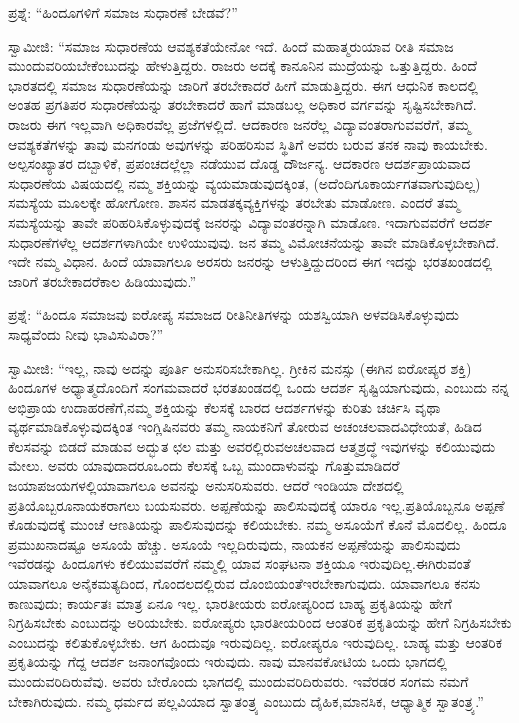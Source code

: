 \eject

ಪ್ರಶ್ನೆ: “ಹಿಂದೂಗಳಿಗೆ ಸಮಾಜ ಸುಧಾರಣೆ ಬೇಡವೆ?”

ಸ್ವಾಮೀಜಿ: “ಸಮಾಜ ಸುಧಾರಣೆಯ ಆವಶ್ಯಕತೆಯೇನೋ ಇದೆ. ಹಿಂದೆ ಮಹಾತ್ಮರು\break ಯಾವ ರೀತಿ ಸಮಾಜ ಮುಂದುವರಿಯಬೇಕೆಂಬುದನ್ನು ಹೇಳುತ್ತಿದ್ದರು. ರಾಜರು ಅದಕ್ಕೆ ಕಾನೂನಿನ ಮುದ್ರೆಯನ್ನು ಒತ್ತುತ್ತಿದ್ದರು. ಹಿಂದೆ ಭಾರತದಲ್ಲಿ ಸಮಾಜ ಸುಧಾರಣೆಯನ್ನು ಜಾರಿಗೆ ತರಬೇಕಾದರೆ ಹೀಗೆ ಮಾಡುತ್ತಿದ್ದರು. ಈಗ ಆಧುನಿಕ ಕಾಲದಲ್ಲಿ ಅಂತಹ ಪ್ರಗತಿಪರ ಸುಧಾರಣೆಯನ್ನು ತರಬೇಕಾದರೆ ಹಾಗೆ ಮಾಡಬಲ್ಲ ಅಧಿಕಾರ ವರ್ಗವನ್ನು ಸೃಷ್ಟಿಸಬೇಕಾಗಿದೆ. ರಾಜರು ಈಗ ಇಲ್ಲವಾಗಿ ಅಧಿಕಾರವೆಲ್ಲ ಪ್ರಜೆಗಳಲ್ಲಿದೆ. ಆದಕಾರಣ ಜನರೆಲ್ಲ ವಿದ್ಯಾವಂತರಾಗುವವರೆಗೆ, ತಮ್ಮ ಆವಶ್ಯಕತೆಗಳನ್ನು ತಾವು ಮನಗಂಡು ಅವುಗಳನ್ನು ಪರಿಹರಿಸುವ ಸ್ಥಿತಿಗೆ ಅವರು ಬರುವ ತನಕ ನಾವು ಕಾಯಬೇಕು. ಅಲ್ಪಸಂಖ್ಯಾತರ ದಬ್ಬಾಳಿಕೆ, ಪ್ರಪಂಚದಲ್ಲೆಲ್ಲಾ ನಡೆಯುವ ದೊಡ್ಡ ದೌರ್ಜನ್ಯ. ಆದಕಾರಣ ಆದರ್ಶಪ್ರಾಯವಾದ ಸುಧಾರಣೆಯ ವಿಷಯದಲ್ಲಿ ನಮ್ಮ ಶಕ್ತಿಯನ್ನು ವ್ಯಯಮಾಡುವುದಕ್ಕಿಂತ, (ಅದೆಂದಿಗೂ\break ಕಾರ್ಯಗತವಾಗುವುದಿಲ್ಲ) ಸಮಸ್ಯೆಯ ಮೂಲಕ್ಕೇ ಹೋಗೋಣ. ಶಾಸನ ಮಾಡತಕ್ಕ\break ವ್ಯಕ್ತಿಗಳನ್ನು ತರಬೇತು ಮಾಡೋಣ. ಎಂದರೆ ತಮ್ಮ ಸಮಸ್ಯೆಯನ್ನು ತಾವೇ ಪರಿಹರಿಸಿಕೊಳ್ಳುವುದಕ್ಕೆ ಜನರನ್ನು ವಿದ್ಯಾವಂತರನ್ನಾಗಿ ಮಾಡೊಣ. ಇದಾಗುವವರೆಗೆ ಆದರ್ಶ ಸುಧಾರಣೆಗಳೆಲ್ಲ ಆದರ್ಶಗಳಾಗಿಯೇ ಉಳಿಯುವುವು. ಜನ ತಮ್ಮ ವಿಮೋಚನೆಯನ್ನು ತಾವೇ ಮಾಡಿಕೊಳ್ಳಬೇಕಾಗಿದೆ. ಇದೇ ನಮ್ಮ ವಿಧಾನ. ಹಿಂದೆ ಯಾವಾಗಲೂ ಅರಸರು ಜನರನ್ನು ಆಳುತ್ತಿದ್ದುದರಿಂದ ಈಗ ಇದನ್ನು ಭರತಖಂಡದಲ್ಲಿ ಜಾರಿಗೆ ತರಬೇಕಾದರೆ\break ಕಾಲ ಹಿಡಿಯುವುದು.”

\vskip 4pt

ಪ್ರಶ್ನೆ: “ಹಿಂದೂ ಸಮಾಜವು ಐರೋಪ್ಯ ಸಮಾಜದ ರೀತಿನೀತಿಗಳನ್ನು ಯಶಸ್ವಿಯಾಗಿ ಅಳವಡಿಸಿಕೊಳ್ಳುವುದು ಸಾಧ್ಯವೆಂದು ನೀವು ಭಾವಿಸುವಿರಾ?”

\vskip 4pt

ಸ್ವಾಮೀಜಿ: “ಇಲ್ಲ, ನಾವು ಅದನ್ನು ಪೂರ್ತಿ ಅನುಸರಿಸಬೇಕಾಗಿಲ್ಲ. ಗ್ರೀಕಿನ ಮನಸ್ಸು (ಈಗಿನ ಐರೋಪ್ಯರ ಶಕ್ತಿ) ಹಿಂದೂಗಳ ಅಧ್ಯಾತ್ಮದೊಂದಿಗೆ ಸಂಗಮವಾದರೆ ಭರತಖಂಡದಲ್ಲಿ ಒಂದು ಆದರ್ಶ ಸೃಷ್ಟಿಯಾಗುವುದು, ಎಂಬುದು ನನ್ನ ಅಭಿಪ್ರಾಯ ಉದಾಹರಣೆಗೆ,\break ನಮ್ಮ ಶಕ್ತಿಯನ್ನು ಕೆಲಸಕ್ಕೆ ಬಾರದ ಆದರ್ಶಗಳನ್ನು ಕುರಿತು ಚರ್ಚಿಸಿ ವೃಥಾ ವ್ಯರ್ಥಮಾಡಿ\-ಕೊಳ್ಳುವುದಕ್ಕಿಂತ ಇಂಗ್ಲಿಷಿನವರು ತಮ್ಮ ನಾಯಕನಿಗೆ ತೋರುವ ಅಚಂಚಲವಾದ\break ವಿಧೇಯತೆ, ಹಿಡಿದ ಕೆಲಸವನ್ನು ಬಿಡದೆ ಮಾಡುವ ಅದ್ಭುತ ಛಲ ಮತ್ತು ಅವರಲ್ಲಿರುವ\break ಅಚಲವಾದ ಆತ್ಮಶ್ರದ್ಧೆ ಇವುಗಳನ್ನು ಕಲಿಯುವುದು ಮೇಲು. ಅವರು ಯಾವುದಾದರೂ\break ಒಂದು ಕೆಲಸಕ್ಕೆ ಒಬ್ಬ ಮುಂದಾಳುವನ್ನು ಗೊತ್ತುಮಾಡಿದರೆ ಜಯಾಪಜಯಗಳಲ್ಲಿ\break ಯಾವಾಗಲೂ ಅವನನ್ನು ಅನುಸರಿಸುವರು. ಆದರೆ ಇಂಡಿಯಾ ದೇಶದಲ್ಲಿ ಪ್ರತಿಯೊಬ್ಬರೂ\break ನಾಯಕರಾಗಲು ಬಯಸುವರು. ಅಪ್ಪಣೆಯನ್ನು ಪಾಲಿಸುವುದಕ್ಕೆ ಯಾರೂ ಇಲ್ಲ.\break ಪ್ರತಿಯೊಬ್ಬನೂ ಅಪ್ಪಣೆ ಕೊಡುವುದಕ್ಕೆ ಮುಂಚೆ ಆಣತಿಯನ್ನು ಪಾಲಿಸುವುದನ್ನು ಕಲಿಯಬೇಕು. ನಮ್ಮ ಅಸೂಯೆಗೆ ಕೊನೆ ಮೊದಲಿಲ್ಲ. ಹಿಂದೂ ಪ್ರಮುಖನಾದಷ್ಟೂ ಅಸೂಯೆ ಹೆಚ್ಚು. ಅಸೂಯೆ ಇಲ್ಲದಿರುವುದು, ನಾಯಕನ ಅಪ್ಪಣೆಯನ್ನು ಪಾಲಿಸುವುದು ಇವೆರಡನ್ನು ಹಿಂದೂಗಳು ಕಲಿಯುವವರೆಗೆ ನಮ್ಮಲ್ಲಿ ಯಾವ ಸಂಘಟನಾ ಶಕ್ತಿಯೂ ಇರುವುದಿಲ್ಲ.\break ಈಗಿರುವಂತೆ ಯಾವಾಗಲೂ ಅನೈಕಮತ್ಯದಿಂದ, ಗೊಂದಲದಲ್ಲಿರುವ ದೊಂಬಿಯಂತೆ\break ಇರಬೇಕಾಗುವುದು. ಯಾವಾಗಲೂ ಕನಸು ಕಾಣುವುದು; ಕಾರ್ಯತಃ ಮಾತ್ರ ಏನೂ ಇಲ್ಲ. ಭಾರತೀಯರು ಐರೋಪ್ಯರಿಂದ ಬಾಹ್ಯ ಪ್ರಕೃತಿಯನ್ನು ಹೇಗೆ ನಿಗ್ರಹಿಸಬೇಕು ಎಂಬುದನ್ನು ಅರಿಯಬೇಕು. ಐರೋಪ್ಯರು ಭಾರತೀಯರಿಂದ ಆಂತರಿಕ ಪ್ರಕೃತಿಯನ್ನು ಹೇಗೆ ನಿಗ್ರಹಿಸಬೇಕು ಎಂಬುದನ್ನು ಕಲಿತುಕೊಳ್ಳಬೇಕು. ಆಗ ಹಿಂದುವೂ ಇರುವುದಿಲ್ಲ. ಐರೋಪ್ಯರೂ ಇರುವುದಿಲ್ಲ. ಬಾಹ್ಯ ಮತ್ತು ಆಂತರಿಕ ಪ್ರಕೃತಿಯನ್ನು ಗೆದ್ದ ಆದರ್ಶ ಜನಾಂಗವೊಂದು ಇರುವುದು. ನಾವು ಮಾನವಕೋಟಿಯ ಒಂದು ಭಾಗದಲ್ಲಿ ಮುಂದುವರಿದಿರುವೆವು. ಅವರು ಬೇರೊಂದು ಭಾಗದಲ್ಲಿ ಮುಂದುವರಿದಿರುವರು. ಇವೆರಡರ ಸಂಗಮ ನಮಗೆ ಬೇಕಾಗಿರುವುದು. ನಮ್ಮ ಧರ್ಮದ ಪಲ್ಲವಿಯಾದ ಸ್ವಾತಂತ್ರ್ಯ ಎಂಬುದು ದೈಹಿಕ,\break ಮಾನಸಿಕ, ಆಧ್ಯಾತ್ಮಿಕ ಸ್ವಾತಂತ್ರ್ಯ.”

